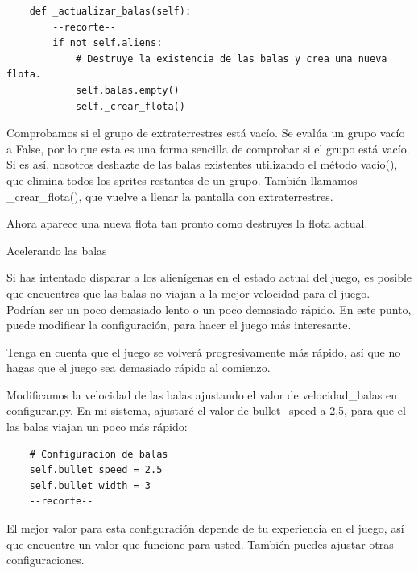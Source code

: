 \hspace{-2.4cm}{\ttfamily \scriptsize invasión}

\vspace{-0.2cm}
\hspace{-2.1cm}{\ttfamily \scriptsize \_alien.py}\vspace{-0.84cm}
\begin{lstlisting}
    def _actualizar_balas(self):
        --recorte--
        if not self.aliens:
            # Destruye la existencia de las balas y crea una nueva flota.
            self.balas.empty()
            self._crear_flota()
\end{lstlisting}

Comprobamos si el grupo de extraterrestres está vacío. Se evalúa un grupo vacío
a False, por lo que esta es una forma sencilla de comprobar si el grupo está vacío. Si es así, nosotros
deshazte de las balas existentes utilizando el método vacío(), que elimina
todos los sprites restantes de un grupo. También llamamos \_crear\_flota(), que
vuelve a llenar la pantalla con extraterrestres.

Ahora aparece una nueva flota tan pronto como destruyes la flota actual.

{\ttfamily Acelerando las balas}

Si has intentado disparar a los alienígenas en el estado actual del juego, es posible que encuentres
que las balas no viajan a la mejor velocidad para el juego. Podrían ser un poco demasiado lento o un poco demasiado rápido. En este punto, puede modificar la configuración, para hacer el juego más interesante. 

Tenga en cuenta que el juego se volverá progresivamente más rápido, así que no hagas que el juego sea demasiado rápido al
comienzo.

Modificamos la velocidad de las balas ajustando el valor de {\ttfamily velocidad\_balas}
en {\ttfamily configurar.py}. En mi sistema, ajustaré el valor de bullet\_speed a 2,5, para que el
las balas viajan un poco más rápido:


\hspace{-2.5cm}{\ttfamily \scriptsize configurar.py}  \vspace{-0.5cm}
\begin{lstlisting}	
    # Configuracion de balas
    self.bullet_speed = 2.5
    self.bullet_width = 3
    --recorte--
\end{lstlisting}


El mejor valor para esta configuración depende de tu experiencia en el juego, así que encuentre un valor que funcione para usted. 
También puedes ajustar otras configuraciones.

